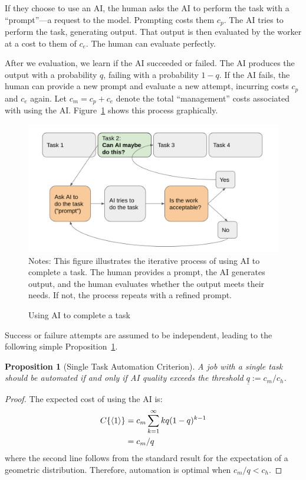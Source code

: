 \documentclass{article}
\newtheorem{proposition}[theorem]{Proposition}
\begin{document}
If they choose to use an AI, the human asks the AI to perform the task with a ``prompt''---a request to the model. 
Prompting costs them $c_{p}$.
The AI tries to perform the task, generating output.
That output is then evaluated by the worker at a cost to them of $c_{e}$.
The human can evaluate perfectly.

After we evaluation, we learn if the AI succeeded or failed.
The AI produces the output with a probability $q$, failing with a probability $1-q$.
If the AI fails, the human can provide a new prompt and evaluate a new attempt, incurring costs $c_p$ and $c_e$ again.
Let $c_m = c_p + c_e$ denote the total ``management'' costs associated with using the AI.
Figure~\ref{fig:flow} shows this process graphically.

\begin{figure}[h]
  \centering
  \caption{Using AI to complete a task} \label{fig:flow}
  \includegraphics[width = \textwidth]{images/flow.png}
  \footnotesize{Notes: This figure illustrates the iterative process of using AI to complete a task. The human provides a prompt, the AI generates output, and the human evaluates whether the output meets their needs. If not, the process repeats with a refined prompt.}
\end{figure}

Success or failure attempts are assumed to be independent, leading to the following simple Proposition~\ref{proposition:single}.

\begin{proposition}[Single Task Automation Criterion] \label{proposition:single}
A job with a single task should be automated if and only if AI quality exceeds the threshold $\underline{q} := c_m / c_h$.
\end{proposition}
\begin{proof}
The expected cost of using the AI is:
\begin{align*}
    C\{ \langle 1 \rangle \} &= c_m \sum_{k=1}^{\infty} k q(1-q)^{k-1} \\
    &= c_m/q
\end{align*}
where the second line follows from the standard result for the expectation of a geometric distribution.
Therefore, automation is optimal when $c_m/q < c_h$.
\end{proof}
\end{document}

